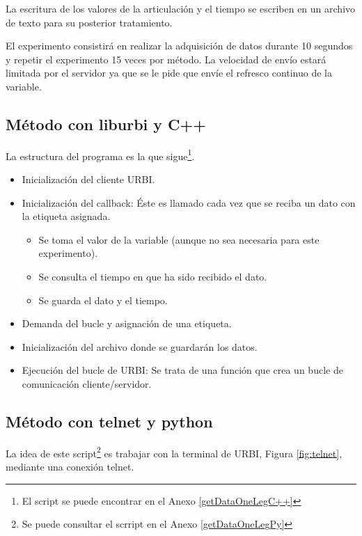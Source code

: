 \documentclass[12pt,a4paper,final,twoside]{book}
\begin{document}
La escritura de los valores de la articulación y el tiempo se escriben en un archivo de texto para su posterior tratamiento.

El experimento consistirá en realizar la adquisición de datos durante 10 segundos y repetir el experimento 15 veces por método. La velocidad de envío estará limitada por el servidor ya que se le pide que envíe el refresco continuo de la variable.

\subsection{Método con liburbi y C++}

La estructura del programa es la que sigue\footnote{El script se puede encontrar en el Anexo \ref{getDataOneLegC++}}. 

\begin{itemize}
\item Inicialización del cliente URBI.
\item Inicialización del callback: Éste es llamado cada vez que se reciba un dato con la etiqueta asignada. 
\begin{itemize}
\item Se toma el valor de la variable (aunque no sea necesaria para este experimento).
\item Se consulta el tiempo en que ha sido recibido el dato.
\item Se guarda el dato y el tiempo.
\end{itemize}
\item Demanda del bucle y asignación de una etiqueta.
\item Inicialización del archivo donde se guardarán los datos.
\item Ejecución del bucle de URBI: Se trata de una función que crea un bucle de comunicación cliente/servidor. 
\end{itemize}

\subsection{Método con telnet y python}
La idea de este script\footnote{Se puede consultar el scrript en el Anexo \ref{getDataOneLegPy}} es trabajar con la terminal de URBI, Figura \ref{fig:telnet},  mediante una conexión telnet.
\end{document}
